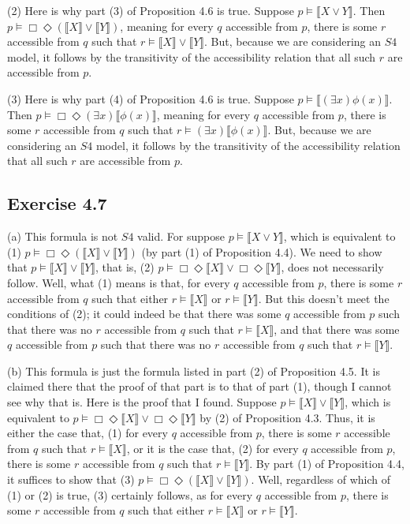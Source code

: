 \documentclass{article}
\theoremstyle{definition}
\begin{document}
(2) Here is why part (3) of Proposition 4.6 is true. Suppose $p\vDash\llbracket X\vee Y\rrbracket$. Then 
$p\vDash\Box\Diamond(\llbracket X\rrbracket\vee\llbracket Y\rrbracket)$, meaning for every 
$q$ accessible from $p$, there is some $r$ accessible from $q$ such that
$r\vDash\llbracket X\rrbracket\vee\llbracket Y\rrbracket$. But, because we are considering an $S4$ model, 
it follows by the transitivity of the accessibility relation that all such $r$ are accessible from $p$.

(3) Here is why part (4) of Proposition 4.6 is true. Suppose $p\vDash\llbracket(\exists x)\phi(x)\rrbracket$.
Then $p\vDash\Box\Diamond(\exists x)\llbracket\phi(x)\rrbracket$, meaning for every 
$q$ accessible from $p$, there is some $r$ accessible from $q$ such that
$r\vDash(\exists x)\llbracket\phi(x)\rrbracket$. But, because we are considering an $S4$ model, 
it follows by the transitivity of the accessibility relation that all such $r$ are accessible from $p$.

\subsection*{Exercise 4.7}
(a) This formula is not $S4$ valid. For suppose $p\vDash\llbracket X\vee Y\rrbracket$, which is equivalent 
to (1) $p\vDash\Box\Diamond(\llbracket X\rrbracket\vee \llbracket Y\rrbracket)$ (by part (1) of Proposition 4.4). We need to show that 
$p\vDash\llbracket X\rrbracket\vee\llbracket Y\rrbracket$, that is, 
(2) $p\vDash\Box\Diamond\llbracket X\rrbracket\vee\Box\Diamond\llbracket Y\rrbracket$, does not necessarily follow. Well, 
what (1) means is that, for every $q$ accessible from $p$, there is some $r$ accessible from $q$ such that 
either $r\vDash\llbracket X\rrbracket$ or $r\vDash\llbracket Y\rrbracket$. But this doesn't meet the conditions of 
(2); it could indeed be that there was some $q$ accessible from $p$ such that 
there was no $r$ accessible from $q$ such that $r\vDash\llbracket X\rrbracket$, and that there was some 
$q$ accessible from $p$ such that there was no $r$ accessible from $q$ such that 
$r\vDash\llbracket Y\rrbracket$.

(b) This formula is just the formula listed in part (2) of Proposition 4.5. It is claimed there that the proof of that part is 
 to that of part (1), though I cannot see why that is. Here is the proof that I found. Suppose 
$p\vDash\llbracket X\rrbracket\vee\llbracket Y\rrbracket$, which is equivalent to
$p\vDash\Box\Diamond\llbracket X\rrbracket\vee\Box\Diamond\llbracket Y\rrbracket$ by (2) of Proposition 4.3.
Thus, it is either the case that, (1) for every 
$q$ accessible from $p$, there is some $r$ accessible from $q$ such that $r\vDash\llbracket X\rrbracket$, or it is the case 
that, (2) for every $q$ accessible from $p$, there is some $r$ accessible from $q$ such that $r\vDash\llbracket Y\rrbracket$. 
By part (1) of Proposition 4.4, it suffices to show that (3) $p\vDash\Box\Diamond(\llbracket X\rrbracket\vee\llbracket Y\rrbracket)$.
Well, regardless of which of (1) or (2) is true, (3) certainly follows, as for every 
$q$ accessible from $p$, there is some $r$ accessible from $q$ such that either 
$r\vDash\llbracket X\rrbracket$ or $r\vDash\llbracket Y\rrbracket$.
\end{document}

